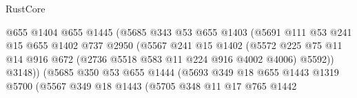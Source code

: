 \begin{lexlean}{RustCore}
\begin{coremodule}
                                      @655
                                      @1404
                                      @655
                                      @1445
                                      (@5685
                                        @343
                                        @53
                                        @655
                                        @1403
                                        (@5691
                                          @111
                                          @53
                                          @241
                                          @15
                                          @655
                                          @1402
                                          @737
                                          @2950
                                          (@5567
                                            @241
                                            @15
                                            @1402
                                            (@5572
                                              @225
                                              @75
                                              @11
                                              @14
                                              @916
                                              @672
                                              (@2736 @5518 @583 @11 @224 @916 @4002 @4006)
                                              @5592))
                                          @3148))
                                      (@5685
                                        @350
                                        @53
                                        @655
                                        @1444
                                        (@5693
                                          @349
                                          @18
                                          @655
                                          @1443
                                          @1319
                                          @5700
                                          (@5567
                                            @349
                                            @18
                                            @1443
                                            (@5705
                                              @348
                                              @11
                                              @17
                                              @765
                                              @1442

\end{coremodule}
\end{lexlean}
